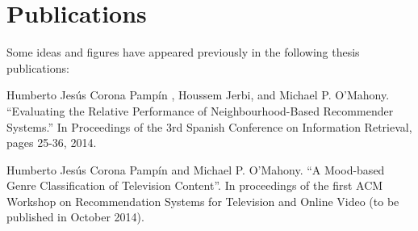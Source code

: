 

\chapter*{Publications} %

Some ideas and figures have appeared previously in the following thesis publications:

\bigskip

Humberto Jes\'{u}s Corona Pamp\'{i}n , Houssem Jerbi, and Michael P. O'Mahony. ``Evaluating the Relative Performance of Neighbourhood-Based Recommender Systems.'' In Proceedings of the 3rd Spanish Conference on Information Retrieval, pages 25-36, 2014.

Humberto Jes\'{u}s Corona Pamp\'{i}n and Michael P. O'Mahony. ``A Mood-based Genre Classification of Television Content''. In proceedings of the first ACM Workshop on Recommendation Systems for Television and Online Video (to be published in October 2014).

\bigskip

